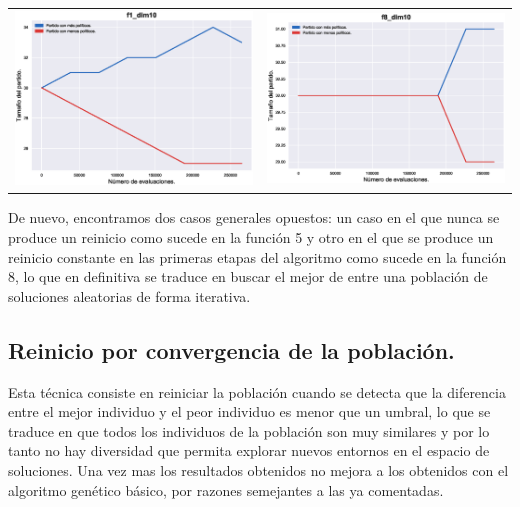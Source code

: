 \documentclass[12pt]{article}
\numberwithin{figure}{section} %
\numberwithin{table}{section} %
\begin{document}
	\begin{table}[H]
	\centering
	\begin{tabular}{ll}
	\includegraphics[width=0.5\linewidth]{./images/restart_convergence_f1_dim10.eps} & \includegraphics[width=0.5\linewidth]{./images/restart_convergence_f8_dim10.eps} \\
	\end{tabular}
	\end{table}
	
	De nuevo, encontramos dos casos generales opuestos: un caso en el que nunca se produce un reinicio como sucede en la función 5 y otro en el que se produce un reinicio constante en las primeras etapas del algoritmo como sucede en la función 8, lo que en definitiva se traduce en buscar el mejor de entre una población de soluciones aleatorias de forma iterativa.
	
	\subsection[Reinicio por convergencia de la población.]{Reinicio por convergencia de la población.}
	
	Esta técnica consiste en reiniciar la población cuando se detecta que la diferencia entre el mejor individuo y el peor individuo es menor que un umbral, lo que se traduce en que todos los individuos de la población son muy similares y por lo tanto no hay diversidad que permita explorar nuevos entornos en el espacio de soluciones. Una vez mas los resultados obtenidos no mejora a los obtenidos con el algoritmo genético básico, por razones semejantes a las ya comentadas.
	
\end{document}

